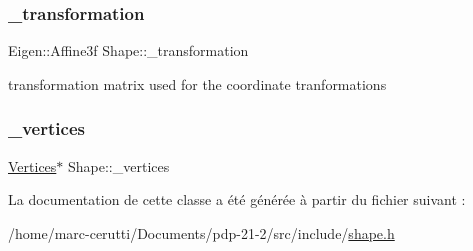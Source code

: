\mbox{\label{class_shape_a67c0ffb0290a2a1ff5e602c324130332}} 
\subsubsection{\texorpdfstring{\+\_\+transformation}{\_transformation}}
{\footnotesize\ttfamily Eigen\+::\+Affine3f Shape\+::\+\_\+transformation\hspace{0.3cm}{\ttfamily [protected]}}



transformation matrix used for the coordinate tranformations 

\mbox{\label{class_shape_ac2f7f1148a34325d99be6d983fcf9bb0}} 
\subsubsection{\texorpdfstring{\+\_\+vertices}{\_vertices}}
{\footnotesize\ttfamily \hyperlink{struct_shape_1_1_vertices}{Vertices}$\ast$ Shape\+::\+\_\+vertices\hspace{0.3cm}{\ttfamily [protected]}}



La documentation de cette classe a été générée à partir du fichier suivant \+:\begin{DoxyCompactItemize}
\item 
/home/marc-\/cerutti/\+Documents/pdp-\/21-\/2/src/include/\hyperlink{shape_8h}{shape.\+h}\end{DoxyCompactItemize}
